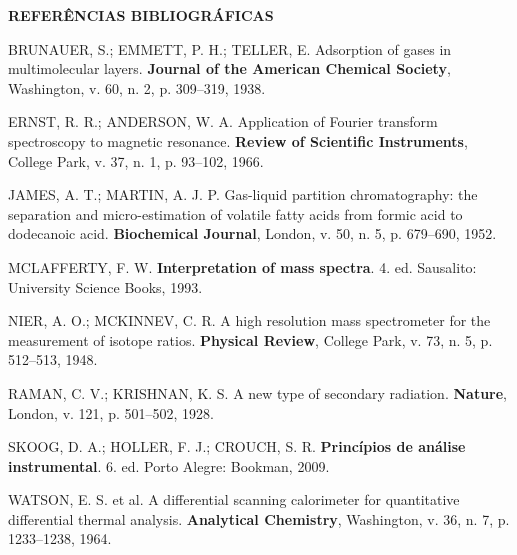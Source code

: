 %

\vspace{1\baselineskip}
{\centering\bfseries REFERÊNCIAS BIBLIOGRÁFICAS\par}
\begingroup
\vspace{-0.5\baselineskip}
\singlespacing
\setlength{\parskip}{\baselineskip}
\setlength{\parindent}{0pt}

BRUNAUER, S.; EMMETT, P. H.; TELLER, E. Adsorption of gases in multimolecular layers. \textbf{Journal of the American Chemical Society}, Washington, v. 60, n. 2, p. 309--319, 1938.

ERNST, R. R.; ANDERSON, W. A. Application of Fourier transform spectroscopy to magnetic resonance. \textbf{Review of Scientific Instruments}, College Park, v. 37, n. 1, p. 93--102, 1966.

JAMES, A. T.; MARTIN, A. J. P. Gas-liquid partition chromatography: the separation and micro-estimation of volatile fatty acids from formic acid to dodecanoic acid. \textbf{Biochemical Journal}, London, v. 50, n. 5, p. 679--690, 1952.

MCLAFFERTY, F. W. \textbf{Interpretation of mass spectra}. 4. ed. Sausalito: University Science Books, 1993.

NIER, A. O.; MCKINNEV, C. R. A high resolution mass spectrometer for the measurement of isotope ratios. \textbf{Physical Review}, College Park, v. 73, n. 5, p. 512--513, 1948.

RAMAN, C. V.; KRISHNAN, K. S. A new type of secondary radiation. \textbf{Nature}, London, v. 121, p. 501--502, 1928.

SKOOG, D. A.; HOLLER, F. J.; CROUCH, S. R. \textbf{Princípios de análise instrumental}. 6. ed. Porto Alegre: Bookman, 2009.

WATSON, E. S. et al. A differential scanning calorimeter for quantitative differential thermal analysis. \textbf{Analytical Chemistry}, Washington, v. 36, n. 7, p. 1233--1238, 1964.

\endgroup
